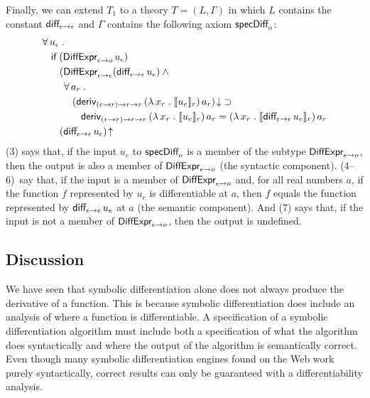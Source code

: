 \documentclass[fleqn]{llncs}
\begin{document}
Finally, we can extend $T_1$ to a theory $T = (L,\Gamma)$ in which $L$
contains the constant $\mbox{\sf diff}_{\epsilon \rightarrow \epsilon}$ and
$\Gamma$ contains the following axiom $\mbox{\sf specDiff}_o$:
\begin{align}\setcounter{equation}{0}
&
\ForallApp u_\epsilon \mdot\\
& \hspace*{2ex}
\If \; (\mname{DiffExpr}_{\epsilon \tarrow o} \, u_\epsilon)\\
& \hspace*{4ex}
(\mname{DiffExpr}_{\epsilon \tarrow \epsilon}(\mname{diff}_{\epsilon \tarrow \epsilon} \, u_\epsilon) \And {}\\
& \hspace*{5ex}
\ForallApp a_r \mdot\\
& \hspace*{7ex}
{(\mname{deriv}_{(r \tarrow r) \tarrow r \tarrow r}\,(\LambdaApp x_r \mdot \sembrack{u_e}_r)\,a_r)\IsDefApp} \Implies {}\\
& \hspace*{9ex}
\mname{deriv}_{(r \tarrow r) \tarrow r \tarrow r}\,(\LambdaApp x_r \mdot \sembrack{u_e}_r)\,a_r =
(\LambdaApp x_r \mdot \sembrack{\mname{diff}_{\epsilon \tarrow \epsilon} \, u_e}_r)\,a_r\\
& \hspace*{4ex}
(\mname{diff}_{\epsilon \tarrow \epsilon} \, u_\epsilon)\IsUndefApp
\end{align}
(3) says that, if the input $u_e$ to $\mbox{\sf specDiff}_o$ is a member
of the subtype $\mbox{\sf DiffExpr}_{\epsilon \rightarrow o}$, then the
output is also a member of $\mbox{\sf DiffExpr}_{\epsilon \rightarrow o}$
(the syntactic component). (\mbox{4--6})~say that, if the input is a
member of $\mbox{\sf DiffExpr}_{\epsilon \rightarrow o}$ and, for all real
numbers $a$, if the function $f$ represented by $u_e$ is
differentiable at $a$, then $f$ equals the function represented by
$\mbox{\sf diff}_{\epsilon \rightarrow \epsilon} \, u_e$ at $a$ (the semantic
component).  And (7) says that, if the input is not a member of
$\mbox{\sf DiffExpr}_{\epsilon \rightarrow o}$, then the output is undefined.

\subsection{Discussion}

We have seen that symbolic differentiation alone does not always
produce the derivative of a function.  This is because symbolic
differentiation does include an analysis of where a function is
differentiable.  A specification of a symbolic differentiation
algorithm must include both a specification of what the algorithm does
syntactically and where the output of the algorithm is semantically
correct.  Even though many symbolic differentiation engines found on
the Web work purely syntactically, correct results can only be
guaranteed with a differentiability analysis.
\end{document}
